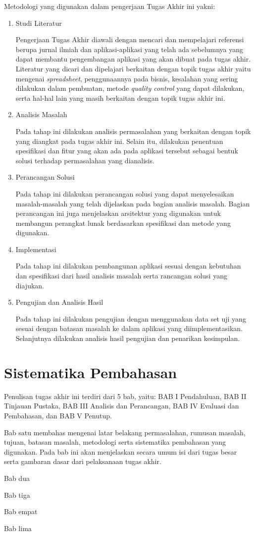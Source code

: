 Metodologi yang digunakan dalam pengerjaan Tugas Akhir ini yakni:
\begin{enumerate}
    \item Studi Literatur

    Pengerjaan Tugas Akhir diawali dengan mencari dan mempelajari referensi berupa jurnal ilmiah dan aplikasi-aplikasi yang telah ada sebelumnya yang dapat membantu pengembangan aplikasi yang akan dibuat pada tugas akhir. Literatur yang dicari dan dipelajari berkaitan dengan topik tugas akhir yaitu mengenai \textit{spreadsheet}, penggunaannya pada bisnis, kesalahan yang sering dilakukan dalam pembuatan, metode \textit{quality control} yang dapat dilakukan, serta hal-hal lain yang masih berkaitan dengan topik tugas akhir ini. 
    
    \item Analisis Masalah

    Pada tahap ini dilakukan analisis permasalahan yang berkaitan dengan topik yang diangkat pada tugas akhir ini. Selain itu, dilakukan penentuan spesifikasi dan fitur yang akan ada pada aplikasi tersebut sebagai bentuk solusi terhadap permasalahan yang dianalisis.

    \item Perancangan Solusi

    Pada tahap ini dilakukan perancangan solusi yang dapat menyelesaikan masalah-masalah yang telah dijelaskan pada bagian analisis masalah. Bagian perancangan ini juga menjelaskan arsitektur yang digunakan untuk membangun perangkat lunak berdasarkan spesifikasi dan metode yang digunakan.

    \item Implementasi

    Pada tahap ini dilakukan pembangunan aplikasi sesuai dengan kebutuhan dan spesifikasi dari hasil analisis masalah serta rancangan solusi yang diajukan.

    \item Pengujian dan Analisis Hasil

    Pada tahap ini dilakukan pengujian dengan menggunakan data set uji yang sesuai dengan batasan masalah ke dalam aplikasi yang diimplementasikan. Selanjutnya dilakukan analisis hasil pengujian dan penarikan kesimpulan.

\end{enumerate}

\section{Sistematika Pembahasan}

Penulisan tugas akhir ini terdiri dari 5 bab, yaitu: BAB I Pendahuluan, BAB II Tinjauan Pustaka, BAB III Analisis dan Perancangan, BAB IV Evaluasi dan Pembahasan, dan BAB V Penutup. 

Bab satu membahas mengenai latar belakang permasalahan, rumusan masalah, tujuan, batasan masalah, metodologi serta sistematika pembahasan yang digunakan. Pada bab ini akan menjelaskan secara umum isi dari tugas besar serta gambaran dasar dari pelaksanaan tugas akhir.

Bab dua 

Bab tiga

Bab empat

Bab lima